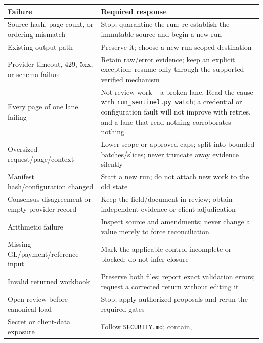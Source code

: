 \documentclass[
]{article}
\newcounter{none} %
\begin{document}
{\def\LTcaptype{none} %
\begin{longtable}[]{@{}
  >{\raggedright\arraybackslash}p{}
  >{\raggedright\arraybackslash}p{}@{}}
\toprule\noalign{}
\begin{minipage}[b]{\linewidth}\raggedright
Failure
\end{minipage} & \begin{minipage}[b]{\linewidth}\raggedright
Required response
\end{minipage} \\
\midrule\noalign{}
\endhead
\bottomrule\noalign{}
\endlastfoot
Source hash, page count, or ordering mismatch & Stop; quarantine the
run; re-establish the immutable source and begin a new run \\
Existing output path & Preserve it; choose a new run-scoped
destination \\
Provider timeout, 429, 5xx, or schema failure & Retain raw/error
evidence; keep an explicit exception; resume only through the supported
verified mechanism \\
Every page of one lane failing & Not review work -- a broken lane. Read
the cause with \texttt{run\_\allowbreak{}sentinel.py watch}; a
credential or configuration fault will not improve with retries, and a
lane that read nothing corroborates nothing \\
Oversized request/page/context & Lower scope or approved caps; split
into bounded batches/slices; never truncate away evidence silently \\
Manifest hash/configuration changed & Start a new run; do not attach new
work to the old state \\
Consensus disagreement or empty provider record & Keep the
field/document in review; obtain independent evidence or client
adjudication \\
Arithmetic failure & Inspect source and amendments; never change a value
merely to force reconciliation \\
Missing GL/payment/reference input & Mark the applicable control
incomplete or blocked; do not infer closure \\
Invalid returned workbook & Preserve both files; report exact validation
errors; request a corrected return without editing it \\
Open review before canonical load & Stop; apply authorized proposals and
rerun the required gates \\
Secret or client-data exposure & Follow \texttt{SECURITY.md}; contain,

\end{longtable}}
\end{document}
